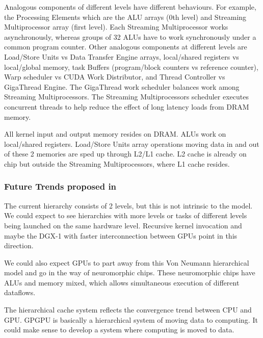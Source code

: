 Analogous components of different levels have different behaviours.
For example, the Processing Elements which are the ALU arrays (0th level) and Streaming Multiprocessor array (first level).
Each Streaming Multiprocessor works asynchronously, whereas groups of 32 ALUs have to work synchronously under a common program counter.
Other analogous components at different levels are Load/Store Units vs Data Transfer Engine arrays, local/shared registers vs local/global memory,
task Buffers (program/block counters vs reference counter), Warp scheduler vs CUDA Work Distributor, and Thread Controller vs GigaThread Engine.
The GigaThread work scheduler balances work among Streaming Multiprocessors.
The Streaming Multiprocessors scheduler executes concurrent threads to help reduce the effect of long latency loads from DRAM memory.

All kernel input and output memory resides on DRAM.
ALUs work on local/shared registers.
Load/Store Units array operations moving data in and out of these 2 memories are sped up through L2/L1 cache.
L2 cache is already on chip but outside the Streaming Multiprocessors, where L1 cache resides.

\subsubsection{Future Trends proposed in \cite{Hu:2016:CLG:2891449.2873053}}

The current hierarchy consists of 2 levels, but this is not intrinsic to the model.
We could expect to see hierarchies with more levels or tasks of different levels being launched on the same hardware level.
Recursive kernel invocation and maybe the DGX-1 with faster interconnection between GPUs point in this direction.

We could also expect GPUs to part away from this Von Neumann hierarchical model and go in the way of neuromorphic chips.
These neuromorphic chips have ALUs and memory mixed, which allows simultaneous execution of different dataflows.

The hierarchical cache system reflects the convergence trend between CPU and GPU.
GPGPU is basically a hierarchical system of moving data to computing.
It could make sense to develop a system where computing is moved to data.


%

